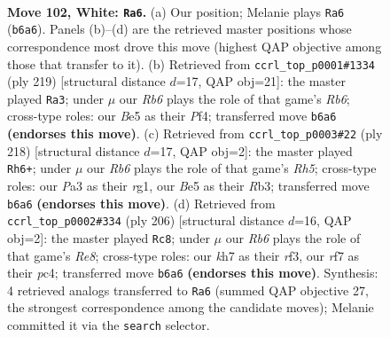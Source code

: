 \documentclass[11pt]{article}
\begin{document}
\clearpage

\begin{figure}[p]\centering
\begin{subfigure}{0.46\textwidth}\centering
\resizebox{\linewidth}{!}{%
\newchessgame
\chessboard[
  setfen={8/5r1k/1R5P/4B3/p7/P7/6K1/8 w - - 1 102},
  showmover=false,
  pgfstyle=straightmove, color=movearrow, markmove={b6-a6}
]}
\caption{}
\end{subfigure}\hfill
\begin{subfigure}{0.46\textwidth}\centering
\resizebox{\linewidth}{!}{%
\newchessgame
\chessboard[
  setfen={8/6R1/8/5k2/5p2/1r5p/7K/8 b - - 29 110},
  showmover=false,
  pgfstyle=straightmove, color=movearrow, markmove={b3-a3}
]}
\caption{}
\end{subfigure}
\\[4pt]
\begin{subfigure}{0.46\textwidth}\centering
\resizebox{\linewidth}{!}{%
\newchessgame
\chessboard[
  setfen={8/8/2r2k2/7R/5P2/1R6/4KP2/6r1 w - - 71 110},
  showmover=false,
  pgfstyle=straightmove, color=movearrow, markmove={h5-h6}
]}
\caption{}
\end{subfigure}\hfill
\begin{subfigure}{0.46\textwidth}\centering
\resizebox{\linewidth}{!}{%
\newchessgame
\chessboard[
  setfen={4R3/8/3k4/8/2pP4/2P2r2/8/6K1 w - - 1 104},
  showmover=false,
  pgfstyle=straightmove, color=movearrow, markmove={e8-c8}
]}
\caption{}
\end{subfigure}
\caption{\textbf{Move 102, White: \texttt{Ra6}.} (a) Our position; Melanie plays \texttt{Ra6} (\texttt{b6a6}). Panels (b)--(d) are the retrieved master positions whose correspondence most drove this move (highest QAP objective among those that transfer to it). (b) Retrieved from \texttt{ccrl\_top\_p0001\#1334} (ply 219) [structural distance $d$=17, QAP obj=21]: the master played \texttt{Ra3}; under $\mu$ our \emph{Rb6} plays the role of that game's \emph{Rb6}; cross-type roles: our \emph{B}e5 as their \emph{P}f4; transferred move \texttt{b6a6} \textbf{(endorses this move)}. (c) Retrieved from \texttt{ccrl\_top\_p0003\#22} (ply 218) [structural distance $d$=17, QAP obj=2]: the master played \texttt{Rh6+}; under $\mu$ our \emph{Rb6} plays the role of that game's \emph{Rh5}; cross-type roles: our \emph{P}a3 as their \emph{r}g1, our \emph{B}e5 as their \emph{R}b3; transferred move \texttt{b6a6} \textbf{(endorses this move)}. (d) Retrieved from \texttt{ccrl\_top\_p0002\#334} (ply 206) [structural distance $d$=16, QAP obj=2]: the master played \texttt{Rc8}; under $\mu$ our \emph{Rb6} plays the role of that game's \emph{Re8}; cross-type roles: our \emph{k}h7 as their \emph{r}f3, our \emph{r}f7 as their \emph{p}c4; transferred move \texttt{b6a6} \textbf{(endorses this move)}. Synthesis: 4 retrieved analogs transferred to \texttt{Ra6} (summed QAP objective 27, the strongest correspondence among the candidate moves); Melanie committed it via the \texttt{search} selector.}
\label{fig:thought-m202}
\end{figure}
\end{document}
